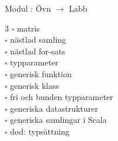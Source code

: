 
    Modul : Övn  $\rightarrow$ Labb 
    \begin{multicols}{3}\SlideFontTiny
    $\square$ matris \\
$\square$ nästlad samling \\
$\square$ nästlad for-sats \\
$\square$ typparameter \\
$\square$ generisk funktion \\
$\square$ generisk klass \\
$\square$ fri och bunden typparameter \\
$\square$ generiska datastrukturer \\
$\square$ generiska samlingar i Scala \\
$\square$ dod: typsättning \\
    \end{multicols}
    